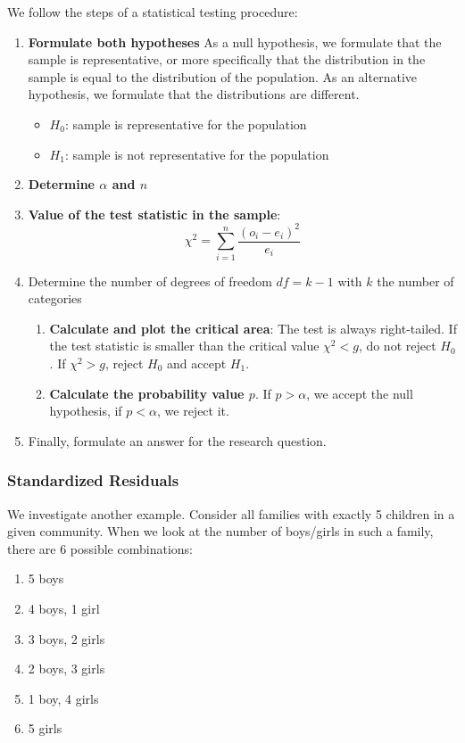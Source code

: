 We follow the steps of a statistical testing procedure:

\begin{enumerate}
  \item \textbf{Formulate both hypotheses}
  As a null hypothesis, we formulate that the sample is representative, or more specifically that the distribution in the sample is equal to the distribution of the population. As an alternative hypothesis, we formulate that the distributions are different.
  \begin{itemize}
    \item $H_{0}$: sample is representative for the population
    \item $H_{1}$: sample is not representative for the population
  \end{itemize}
  \item \textbf{Determine $\alpha$ and $n$}
  \item \textbf{Value of the test statistic in the sample}:
  \[ \chi^{2} = \sum_{i=1}^{n} \frac{(o_{i} - e_{i})^{2}}{e_{i}} \]
  \item Determine the number of degrees of freedom $df = k - 1$ with $k$ the number of categories
  \begin{enumerate}
    \item \textbf{Calculate and plot the critical area}: The test is always right-tailed. If the test statistic is smaller than the critical value $\chi^2 < g$, do not reject $H_{0}$. If $\chi^2 > g$, reject $H_{0}$ and accept $H_{1}$.
    \item \textbf{Calculate the probability value $p$}. If $p > \alpha$, we accept the null hypothesis, if $p < \alpha$, we reject it.
  \end{enumerate}
  \item Finally, formulate an answer for the research question.
\end{enumerate}

\subsubsection{Standardized Residuals}

We investigate another example. Consider all families with exactly 5 children in a given community. When we look at the number of boys/girls in such a family, there are 6 possible combinations:

\begin{enumerate}
  \item 5 boys
  \item 4 boys, 1 girl
  \item 3 boys, 2 girls
  \item 2 boys, 3 girls
  \item 1 boy, 4 girls
  \item 5 girls
\end{enumerate}

